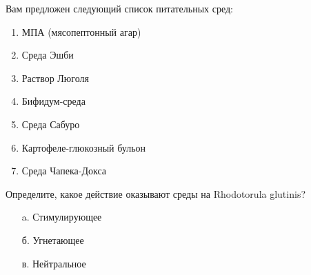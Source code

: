 
Вам предложен следующий список питательных сред:

\begin{enumerate}
    \item МПА (мясопептонный агар)
    \item Среда Эшби
    \item Раствор Люголя
    \item Бифидум-среда
    \item Среда Сабуро
    \item Картофеле-глюкозный бульон
    \item Среда Чапека-Докса
\end{enumerate}

Определите, какое действие оказывают среды на  Rhodotorula glutinis?

\begin{enumerate}
    \item[a.] Стимулирующее
    \item[б.] Угнетающее
    \item[в.] Нейтральное
\end{enumerate}